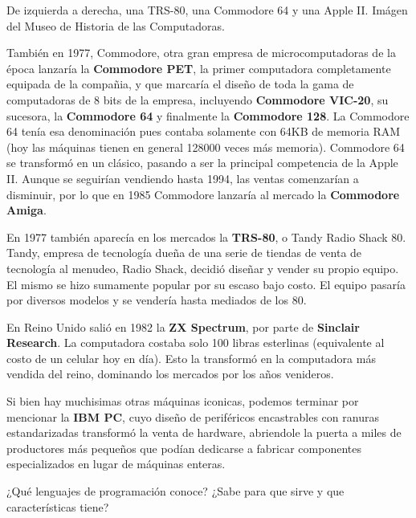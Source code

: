 {De izquierda a derecha, una TRS-80, una Commodore 64 y una Apple II.} {Imágen
del Museo de Historia de las Computadoras.}

También en 1977, Commodore, otra gran empresa de microcomputadoras de la época
lanzaría la \textbf{Commodore PET}, la primer computadora completamente equipada
de la compañia, y que marcaría el diseño de toda la gama de computadoras de 8
bits de la empresa, incluyendo \textbf{Commodore VIC-20}, su sucesora, la
\textbf{Commodore 64} y finalmente la \textbf{Commodore 128}. La Commodore 64
tenía esa denominación pues contaba solamente con 64KB de memoria RAM (hoy las
máquinas tienen en general 128000 veces más memoria). Commodore 64 se transformó
en un clásico, pasando a ser la principal competencia de la Apple II. Aunque se
seguirían vendiendo hasta 1994, las ventas comenzarían a disminuir, por lo que
en 1985 Commodore lanzaría al mercado la \textbf{Commodore Amiga}.

En 1977 también aparecía en los mercados la \textbf{TRS-80}, o Tandy Radio Shack
80. Tandy, empresa de tecnología dueña de una serie de tiendas de venta de
tecnología al menudeo, Radio Shack, decidió diseñar y vender su propio equipo.
El mismo se hizo sumamente popular por su escaso bajo costo. El equipo pasaría
por diversos modelos y se vendería hasta mediados de los 80.

En Reino Unido salió en 1982 la \textbf{ZX Spectrum}, por parte de
\textbf{Sinclair Research}. La computadora costaba solo 100 libras esterlinas
(equivalente al costo de un celular hoy en día). Esto la transformó en la
computadora más vendida del reino, dominando los mercados por los años
venideros.

Si bien hay muchisimas otras máquinas iconicas, podemos terminar por mencionar
la \textbf{IBM PC}, cuyo diseño de periféricos encastrables con ranuras
estandarizadas transformó la venta de hardware, abriendole la puerta a miles de
productores más pequeños que podían dedicarse a fabricar componentes
especializados en lugar de máquinas enteras.
\vspace{1cm}

\begin{exercise}
¿Qué lenguajes de programación conoce? ¿Sabe para que sirve y que
características tiene?
\end{exercise}

